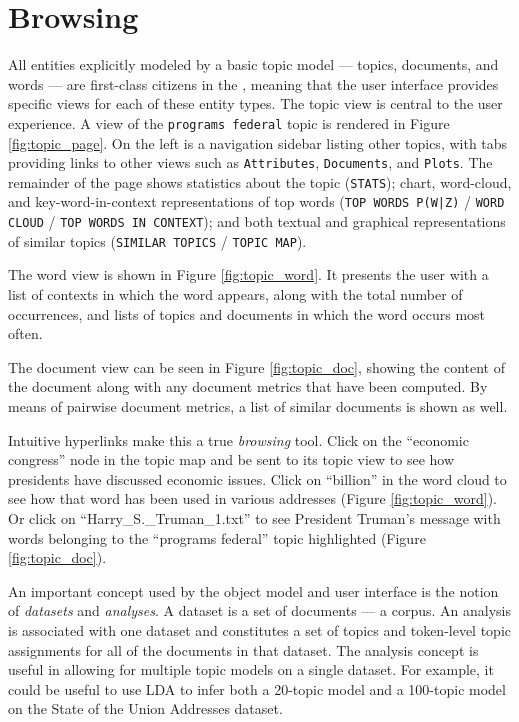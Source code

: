 \documentclass[11pt]{article}
\begin{document}
\section{Browsing}
All entities explicitly modeled by a basic topic model --- topics, documents,
and words --- are first-class citizens in the \tool, meaning that the user
interface provides specific views for each of these entity types. The topic view
is central to the user experience. A view of the \texttt{programs federal} topic is
rendered in Figure \ref{fig:topic_page}. On the left is a navigation sidebar listing other topics,
with tabs providing links to other views such as \texttt{Attributes}, \texttt{Documents}, and \texttt{Plots}.
The remainder of the page shows statistics about the topic
(\texttt{STATS}); chart, word-cloud, and key-word-in-context representations of top
words (\texttt{TOP WORDS P(W|Z)} / \texttt{WORD CLOUD} / \texttt{TOP WORDS IN CONTEXT}); and
both textual and graphical representations of similar topics (\texttt{SIMILAR
TOPICS} / \texttt{TOPIC MAP}).

The word view is shown in Figure \ref{fig:topic_word}. It presents the user with
a list of contexts in which the word appears, along with the total number of
occurrences, and lists of topics and documents in which the word occurs most
often. 

The document view can be seen in Figure \ref{fig:topic_doc}, showing the content
of the document along with any document metrics that have been computed. By
means of pairwise document metrics, a list of similar documents is shown as
well.

Intuitive hyperlinks make this a true \textit{browsing} tool. Click on the
``economic congress'' node in the topic map and be sent to its topic view
to see how presidents have discussed economic issues. Click on ``billion'' in
the word cloud to see how that word has been used in various addresses (Figure
\ref{fig:topic_word}). Or click on ``Harry\_S.\_Truman\_1.txt'' to see
President Truman's message with words belonging to the ``programs federal''
topic highlighted (Figure \ref{fig:topic_doc}).

An important concept used by the \tool{} object model and user interface is the
notion of \textit{datasets} and \textit{analyses}. A dataset is a set of
documents --- a corpus. An analysis is associated with one dataset and
constitutes a set of topics and token-level topic assignments for all of the
documents in that dataset. The analysis concept is useful in allowing for
multiple topic models on a single dataset. For example, it could be useful to
use LDA to infer both a 20-topic model and a 100-topic model on the State of the
Union Addresses dataset.
\end{document}
